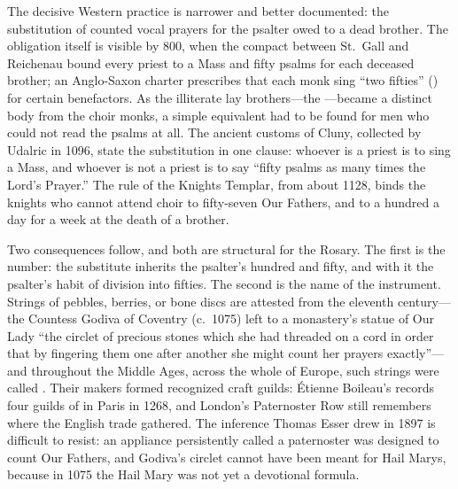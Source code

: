 The decisive Western practice is narrower and better documented: the
substitution of counted vocal prayers for the psalter owed to a dead
brother. The obligation itself is visible by 800, when the compact
between St.~Gall and Reichenau bound every priest to a Mass and fifty
psalms for each deceased brother; an Anglo-Saxon charter prescribes that
each monk sing ``two fifties'' () for certain
benefactors. As the illiterate lay brothers---the ---became
a distinct body from the choir monks, a simple equivalent had to be
found for men who could not read the psalms at all. The ancient customs
of Cluny, collected by Udalric in 1096, state the substitution in one
clause: whoever is a priest is to sing a Mass, and whoever is not a
priest is to say ``fifty psalms  as many times the Lord's
Prayer.'' The rule of the Knights Templar, from about 1128, binds the
knights who cannot attend choir to fifty-seven Our Fathers, and to a
hundred a day for a week at the death of a brother.

Two consequences follow, and both are structural for the Rosary. The
first is the number: the substitute inherits the psalter's hundred and
fifty, and with it the psalter's habit of division into fifties. The
second is the name of the instrument. Strings of pebbles, berries, or
bone discs are attested from the eleventh century---the Countess Godiva
of Coventry (c.~1075) left to a monastery's statue of Our Lady ``the
circlet of precious stones which she had threaded on a cord in order
that by fingering them one after another she might count her prayers
exactly''---and throughout the Middle Ages, across the whole of Europe,
such strings were called . Their makers formed
recognized craft guilds: \'Etienne Boileau's 
records four guilds of  in Paris in 1268, and
London's Paternoster Row still remembers where the English trade
gathered. The inference Thomas Esser drew in 1897 is difficult to
resist: an appliance persistently called a paternoster was designed to
count Our Fathers, and Godiva's circlet cannot have been meant for Hail
Marys, because in 1075 the Hail Mary was not yet a devotional
formula.


